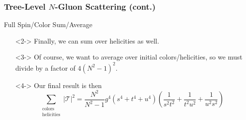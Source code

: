 \documentclass{beamer}
\begin{document}
\begin{frame}
    \frametitle{Tree-Level $N$-Gluon Scattering (cont.)}
    \alert{Full Spin/Color Sum/Average}
    \begin{itemize}
        \item[\textbullet]<2-> Finally, we can sum over helicities as well.
        \item[\textbullet]<3-> Of course, we want to average over initial colors/helicities, so we must divide by a factor of $4(N^2 - 1)^2$.
        \item[\textbullet]<4-> Our final result is then \[ \boxed{\sum_{\substack{\text{colors}\\\text{helicities}}} |\mathcal{T}|^2 = \frac{N^2}{N^2 - 1}g^4(s^4 + t^4 + u^4)\left(\frac{1}{s^2t^2} + \frac{1}{t^2u^2} + \frac{1}{u^2s^2}\right) } \] 
    \end{itemize}
\end{frame}
\end{document}
